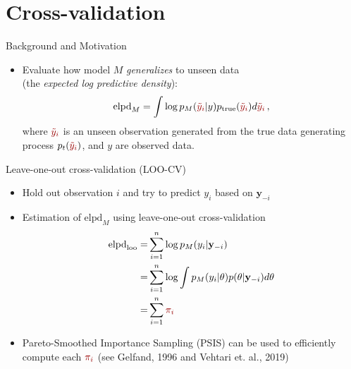 \documentclass[10pt]{beamer}
\begin{document}


\section{Cross-validation}
\frame{\sectionpage}

\begin{frame}{Background and Motivation}
\begin{itemize}
\item Evaluate how model $M$ \emph{generalizes} to unseen data \\(the \emph{expected log predictive density}):
\[
\text{elpd}_M= \int \log p_M({\color{uured}\tilde{y}_i}|y) p_\text{true}({\color{uured}\tilde{y}_i}) d{\color{uured}\tilde{y}_i}\,,
\]
where ${\color{uured}\tilde{y}_i}$ is an unseen observation generated from the true data generating process $p_t({\color{uured}\tilde{y}_i})$, and $y$ are observed data.
\end{itemize}
\end{frame}



\begin{frame}{Leave-one-out cross-validation (LOO-CV)}

\begin{itemize}
\item Hold out observation $i$ and try to predict $y_i$ based on $\mathbf{y}_{-i}$
\item Estimation of $\text{elpd}_M$ using leave-one-out cross-validation
\small
\begin{align*}
\text{elpd}_\text{loo} = & \sum^n_{i=1} \log p_M(y_i|\mathbf{y}_{-i}) \\
 = & \sum^n_{i=1} \log \int p_M(y_i|\theta) p(\theta|\mathbf{y}_{-i})d\theta \\ = & \sum^n_{i=1} {\color{uured}\pi_i}
\end{align*}
\item Pareto-Smoothed Importance Sampling (PSIS) can be used to efficiently compute each ${\color{uured}\pi_i}$ (see Gelfand, 1996 and Vehtari et. al., 2019)
\end{itemize}

\end{frame}
\end{document}

